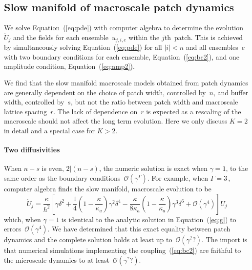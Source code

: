 \documentclass[12pt,a4paper]{article}
\begin{document}
\subsection{Slow manifold of macroscale patch dynamics}
\label{sec:results}
We solve Equation~(\ref{eq:pde}) with computer algebra to determine the evolution~$\dot{U}_j$ and the fields for each ensemble~$u_{j,i,e}$ within the $j$th~patch.  This is achieved by simultaneously solving Equation~(\ref{eq:pde}) for all $|i|<n$ and all ensembles~$e$ with two boundary conditions for each ensemble,  Equation~(\ref{eq:bc2}), and one amplitude condition,  Equation~(\ref{eq:amp2}).


We find that the slow manifold macroscale models obtained from patch dynamics are generally dependent on the choice of patch width, controlled by~$n$, and buffer width, controlled by~$s$, but not the ratio between patch width and macroscale lattice spacing~$r$. The lack of dependence on~$r$ is expected as a rescaling of the macroscale should not affect the long term evolution.  Here we only discuss $K=2$ in detail and a special case for $K>2$.


\paragraph{Two diffusivities}

When $n-s$ is even, $2|(n-s)$, the numeric solution is exact when $\gamma=1$, to the same order as the boundary conditions~$\mathcal O(\gamma^{\Gamma})$. For example, when $\Gamma=3$\,, computer algebra finds the slow manifold, macroscale evolution to be
\begin{equation}
\dot{U}_j=\frac{\kappa}{h^2}\left[\gamma\delta^2+\frac{1}{4}\left(1-\frac{\kappa}{\kappa_a}\right)\gamma^2\delta^4-\frac{\kappa}{8\kappa_a}\left(1-\frac{\kappa}{\kappa_a}\right)\gamma^3\delta^6+\mathcal O(\gamma^4)
\right]U_j
\end{equation}
which, when $\gamma=1$ is identical to the analytic solution in Equation~(\ref{eq:g}) to errors~$\mathcal O(\gamma^4)$. We have determined that this exact equality between patch dynamics and the complete solution holds at least up to~$\mathcal O(\gamma^??)$. The import is that numerical simulations implementing the coupling~(\ref{eq:bc2}) are faithful to the microscale dynamics to at least~$\mathcal O(\gamma^??)$.
\end{document}
